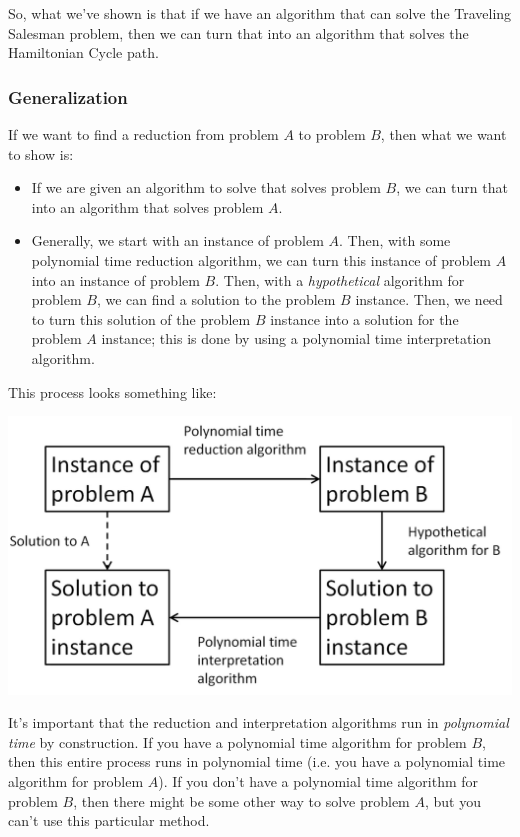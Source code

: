 \documentclass[letterpaper]{article}
\begin{document}
\bigskip 

So, what we've shown is that if we have an algorithm that can solve the Traveling Salesman problem, then we can turn that into an algorithm that solves the Hamiltonian Cycle path. 

\subsubsection{Generalization}
If we want to find a reduction from problem $A$ to problem $B$, then what we want to show is: 
\begin{itemize}
    \item If we are given an algorithm to solve that solves problem $B$, we can turn that into an algorithm that solves problem $A$. 
    \item Generally, we start with an instance of problem $A$. Then, with some polynomial time reduction algorithm, we can turn this instance of problem $A$ into an instance of problem $B$. Then, with a \emph{hypothetical} algorithm for problem $B$, we can find a solution to the problem $B$ instance. Then, we need to turn this solution of the problem $B$ instance into a solution for the problem $A$ instance; this is done by using a polynomial time interpretation algorithm. 
\end{itemize}
This process looks something like: 
\begin{center}
    \includegraphics[scale=0.4]{assets/reduction_cycle.png}
\end{center}
It's important that the reduction and interpretation algorithms run in \emph{polynomial time} by construction. If you have a polynomial time algorithm for problem $B$, then this entire process runs in polynomial time (i.e. you have a polynomial time algorithm for problem $A$). If you don't have a polynomial time algorithm for problem $B$, then there might be some other way to solve problem $A$, but you can't use this particular method. 
\end{document}
